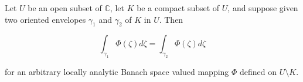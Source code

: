 Let $U$ be an open subset of $\mathbb{C}$, let $K$ be a compact subset of $U$, and suppose given two oriented envelopes $\gamma_1$ and $\gamma_2$ of $K$ in $U$. Then

$$\int_{\gamma_1} \Phi(\zeta) d\zeta = \int_{\gamma_2} \Phi(\zeta) d\zeta$$

for an arbitrary locally analytic Banach space valued mapping $\Phi$ defined on $U \setminus K$.
